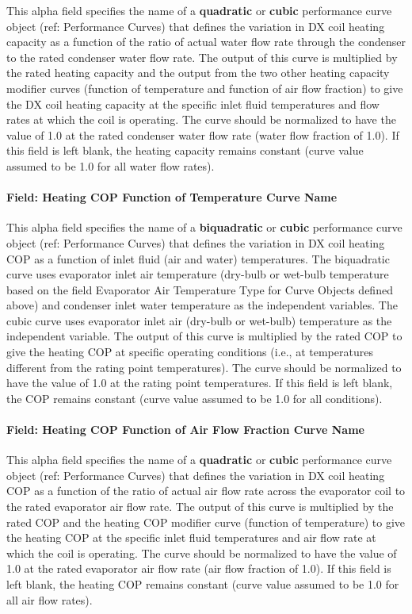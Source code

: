 This alpha field specifies the name of a \textbf{quadratic} or \textbf{cubic} performance curve object (ref: Performance Curves) that defines the variation in DX coil heating capacity as a function of the ratio of actual water flow rate through the condenser to the rated condenser water flow rate. The output of this curve is multiplied by the rated heating capacity and the output from the two other heating capacity modifier curves (function of temperature and function of air flow fraction) to give the DX coil heating capacity at the specific inlet fluid temperatures and flow rates at which the coil is operating. The curve should be normalized to have the value of 1.0 at the rated condenser water flow rate (water flow fraction of 1.0). If this field is left blank, the heating capacity remains constant (curve value assumed to be 1.0 for all water flow rates).

\paragraph{Field: Heating COP Function of Temperature Curve Name}\label{field-heating-cop-function-of-temperature-curve-name}

This alpha field specifies the name of a \textbf{biquadratic} or \textbf{cubic} performance curve object (ref: Performance Curves) that defines the variation in DX coil heating COP as a function of inlet fluid (air and water) temperatures. The biquadratic curve uses evaporator inlet air temperature (dry-bulb or wet-bulb temperature based on the field Evaporator Air Temperature Type for Curve Objects defined above) and condenser inlet water temperature as the independent variables. The cubic curve uses evaporator inlet air (dry-bulb or wet-bulb) temperature as the independent variable. The output of this curve is multiplied by the rated COP to give the heating COP at specific operating conditions (i.e., at temperatures different from the rating point temperatures). The curve should be normalized to have the value of 1.0 at the rating point temperatures. If this field is left blank, the COP remains constant (curve value assumed to be 1.0 for all conditions).

\paragraph{Field: Heating COP Function of Air Flow Fraction Curve Name}\label{field-heating-cop-function-of-air-flow-fraction-curve-name}

This alpha field specifies the name of a \textbf{quadratic} or \textbf{cubic} performance curve object (ref: Performance Curves) that defines the variation in DX coil heating COP as a function of the ratio of actual air flow rate across the evaporator coil to the rated evaporator air flow rate. The output of this curve is multiplied by the rated COP and the heating COP modifier curve (function of temperature) to give the heating COP at the specific inlet fluid temperatures and air flow rate at which the coil is operating. The curve should be normalized to have the value of 1.0 at the rated evaporator air flow rate (air flow fraction of 1.0). If this field is left blank, the heating COP remains constant (curve value assumed to be 1.0 for all air flow rates).


